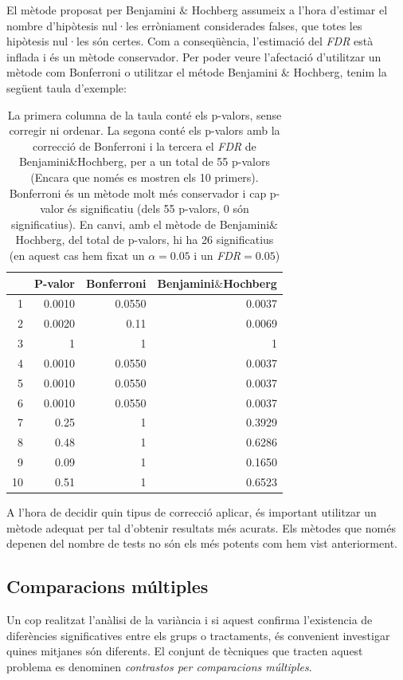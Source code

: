 \documentclass[english]{article}
\begin{document}
El mètode proposat per Benjamini $\&$ Hochberg assumeix a l'hora d'estimar el nombre d'hipòtesis nul·les erròniament considerades falses, que totes les hipòtesis nul·les són certes. Com a conseqüència, l'estimació del \emph{FDR} està inflada i és un mètode conservador. Per poder veure l'afectació d'utilitzar un mètode com Bonferroni o utilitzar el métode Benjamini $\&$ Hochberg, tenim la següent taula d'exemple:
\\
\begin{table}[ht]
\centering
\begin{tabular}{rrrr}
\hline
& P-valor & Bonferroni & Benjamini$\&$Hochberg \\
\hline
1 & 0.0010 & 0.0550 & 0.0037 \\
2 & 0.0020 & 0.11 & 0.0069 \\
3 & 1 & 1 & 1 \\
4 & 0.0010 & 0.0550 & 0.0037 \\
5 & 0.0010 & 0.0550 & 0.0037 \\
6 & 0.0010 & 0.0550 & 0.0037 \\
7 & 0.25 & 1 & 0.3929 \\
8 & 0.48 & 1 & 0.6286 \\
9 & 0.09 & 1 & 0.1650 \\
10 & 0.51 & 1 & 0.6523 \\
\hline
\end{tabular}
\caption{La primera columna de la taula conté els p-valors, sense corregir ni ordenar. La segona conté els p-valors amb la correcció de Bonferroni i la tercera el \emph{FDR} de Benjamini$\&$Hochberg, per a un total de 55 p-valors (Encara que només es mostren els 10 primers). Bonferroni és un mètode molt més conservador i cap p-valor és significatiu (dels 55 p-valors, 0 són significatius). En canvi, amb el mètode de Benjamini$\&$Hochberg, del total de p-valors, hi ha 26 significatius (en aquest cas hem fixat un $\alpha=0.05$ i un \emph{FDR}$=0.05$) }
\end{table}

A l'hora de decidir quin tipus de correcció aplicar, és important utilitzar un mètode adequat per tal d'obtenir resultats més acurats. Els mètodes que només depenen del nombre de tests no són els més potents com hem vist anteriorment.
\newpage
\subsection{Comparacions múltiples}
Un cop realitzat l'anàlisi de la variància i si aquest confirma l'existencia de diferències significatives entre els grups o tractaments, és convenient investigar quines mitjanes són diferents. El conjunt de tècniques que tracten aquest problema es denominen \textit{contrastos per comparacions múltiples}.
\\
\end{document}
